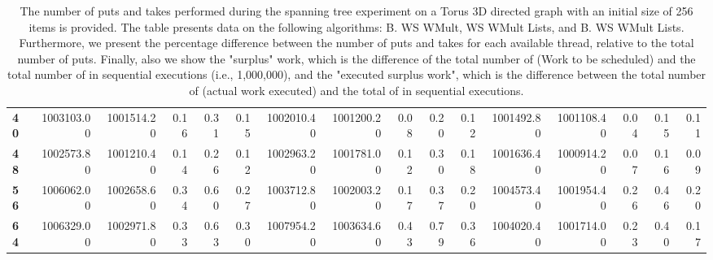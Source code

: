 \begin{table}[!ht]
{\begin{tabular}{lrrrrrrrrrrrrrrr}
\textbf{40} &  1003103.00 & 1001514.20 &           0.16 &        0.31 &                 0.15 &     1002010.40 & 1001200.20 &           0.08 &        0.20 &                 0.12 &        1001492.80 & 1001108.40 &           0.04 &        0.15 &                 0.11 \\
\textbf{48} &  1002573.80 & 1001210.40 &           0.14 &        0.26 &                 0.12 &     1002963.20 & 1001781.00 &           0.12 &        0.30 &                 0.18 &        1001636.40 & 1000914.20 &           0.07 &        0.16 &                 0.09 \\
\textbf{56} &  1006062.00 & 1002658.60 &           0.34 &        0.60 &                 0.27 &     1003712.80 & 1002003.20 &           0.17 &        0.37 &                 0.20 &        1004573.40 & 1001954.40 &           0.26 &        0.46 &                 0.20 \\
\textbf{64} &  1006329.00 & 1002971.80 &           0.33 &        0.63 &                 0.30 &     1007954.20 & 1003634.60 &           0.43 &        0.79 &                 0.36 &        1004020.40 & 1001714.00 &           0.23 &        0.40 &                 0.17 \\
\bottomrule
\end{tabular}}
\label{difference-Torus_3D_directed-256-B_WS_NC_MULT_OPT-WS_NC_MULT_LA_OPT-B_WS_NC_MULT_LA_OPT}
\caption{The number of puts and takes performed during the
    spanning tree experiment on a Torus 3D directed graph with an initial size
    of 256 items is provided. The table presents data on the
    following algorithms: B. WS WMult, WS WMult Lists, and
    B. WS WMult Lists. Furthermore, we present the percentage difference
    between the number of puts and takes for each available thread,
    relative to the total number of puts. Finally, also we show the
    "surplus" work, which is the difference of the total number of
    \Puts (Work to be scheduled) and the total number of \Puts in
    sequential executions (i.e., 1,000,000), and the "executed surplus
    work", which is the difference between the total number of \Takes
    (actual work executed) and the total of \Takes in sequential
    executions.}
\end{table}
